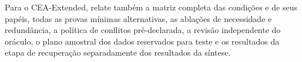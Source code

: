 \documentclass[10pt,twocolumn]{article}
\begin{document}
Para o CEA-Extended, relate também a matriz completa das condições e de seus
papéis, todas as provas mínimas alternativas, as ablações de necessidade e
redundância, a política de conflitos pré-declarada, a revisão independente do
oráculo, o plano amostral dos dados reservados para teste e os resultados da
etapa de recuperação separadamente dos resultados da síntese.

\begingroup
\scriptsize
\setlength{\bibsep}{0pt}


\endgroup
\end{document}

